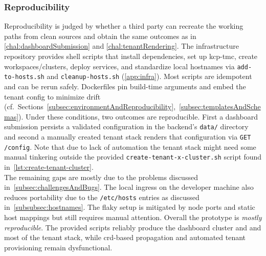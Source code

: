 \documentclass[11pt, a4paper, oneside, listof=totoc]{scrartcl}
\begin{document}
            \subsubsection{Reproducibility}\label{subsubsec:evalReproducibility}
                Reproducibility is judged by whether a third party can recreate the working paths
                from clean sources and obtain the same outcomes as in
                \autoref{chal:dashboardSubmission} and \autoref{chal:tenantRendering}.
                The infrastructure repository provides shell scripts that install dependencies, set
                up \gls{kcp}-\gls{tmc}, create workspaces/clusters, deploy services, and standardize
                local hostnames via \texttt{add-to-hosts.sh} and \texttt{cleanup-hosts.sh}
                (\autoref{app:infra}).
                Most scripts are idempotent and can be rerun safely.
                Dockerfiles pin build-time arguments and embed the tenant config to minimize drift
                (cf.\ Sections~\autoref{subsec:environmentAndReproducibility},~\autoref{subsec:templatesAndSchemas}).
                Under these conditions, two outcomes are reproducible.
                First a dashboard submission persists a validated configuration in the backend's
                \texttt{data/} directory and second a manually created tenant stack renders that
                configuration via \texttt{GET /config}.
                Note that due to lack of automation the tenant stack might need some manual
                tinkering outside the provided \texttt{create-tenant-x-cluster.sh} script found
                in~\autoref{lst:create-tenant-cluster}.\\
                The remaining gaps are mostly due to the problems discussed
                in~\autoref{subsec:challengesAndBugs}.
                The local \gls{ingress} on the developer machine also reduces portability due to the
                \texttt{/etc/hosts} entries as discussed in~\autoref{subsubsec:hostnames}.
                The flaky setup is mitigated by node ports and static host mappings but still
                requires manual attention. Overall the prototype is \emph{mostly reproducible}.
                The provided scripts reliably produce the dashboard cluster and and most of the
                tenant stack, while \gls{crd}-based propagation and automated tenant provisioning
                remain dysfunctional.
\end{document}
